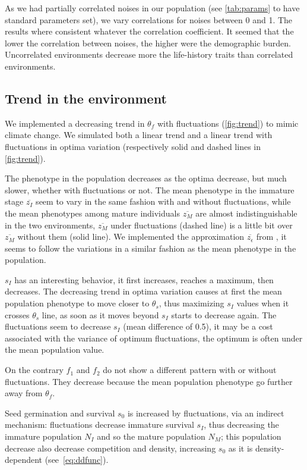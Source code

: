 As we had partially correlated noises in our population (see \autoref{tab:params} to have standard parameters set), we vary correlations for noises between 0 and 1. The results where consistent whatever the correlation coefficient. It seemed that the lower the correlation between noises, the higher were the demographic burden. Uncorrelated environments decrease more the life-history traits than correlated environments.

\subsection*{Trend in the environment}

We implemented a decreasing trend in $\theta_f$ with fluctuations (\autoref{fig:trend}) to mimic climate change. We simulated both a linear trend and a linear trend with fluctuations in optima variation (respectively solid and dashed lines in \autoref{fig:trend}).

The phenotype in the population decreases as the optima decrease, but much slower, whether with fluctuations or not. The mean phenotype in the immature stage $\overline{z_I}$ seem to vary in the same fashion with and without fluctuations, while the mean phenotypes among mature individuals $\overline{z_M}$ are almost indistinguishable in the two environments, $\overline{z_M}$ under fluctuations (dashed line) is a little bit over $\overline{z_M}$ without them (solid line). We implemented the approximation $\overline{z_\epsilon}$ from \citep{engen_evolution_2011}, it seems to follow the variations in a similar fashion as the mean phenotype in the population.

$s_I$ has an interesting behavior, it first increases, reaches a maximum, then decreases. The decreasing trend in optima variation causes at first the mean population phenotype to move closer to $\theta_s$, thus maximizing $s_I$ values when it crosses $\theta_s$ line, as soon as it moves beyond $s_I$ starts to decrease again. The fluctuations seem to decrease $s_I$ (mean difference of 0.5), it may be a cost associated with the variance of optimum fluctuations, the optimum is often under the mean population value.

On the contrary $f_1$ and $f_2$ do not show a different pattern with or without fluctuations. They decrease because the mean population phenotype go further away from $\theta_f$.

Seed germination and survival $s_0$ is increased by fluctuations, via an indirect mechanism: fluctuations decrease immature survival $s_I$, thus decreasing the immature population $N_I$ and so the mature population $N_M$; this population decrease also decrease competition and density, increasing $s_0$ as it is density-dependent (see~\autoref{eq:ddfunc}).

